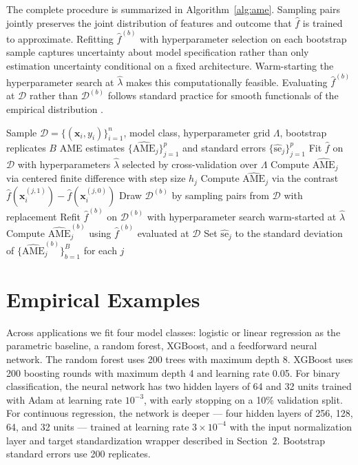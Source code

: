 \documentclass[conference]{IEEEtran}
\begin{document}
	The complete procedure is summarized in Algorithm~\ref{alg:ame}. Sampling pairs jointly preserves the joint distribution of features and outcome that $\hat{f}$ is trained to approximate. Refitting $\hat{f}^{(b)}$ with hyperparameter selection on each bootstrap sample captures uncertainty about model specification rather than only estimation uncertainty conditional on a fixed architecture. Warm-starting the hyperparameter search at $\hat{\lambda}$ makes this computationally feasible. Evaluating $\hat{f}^{(b)}$ at $\mathcal{D}$ rather than $\mathcal{D}^{(b)}$ follows standard practice for smooth functionals of the empirical distribution \cite{efrontibshirani1993}.
	
	\begin{algorithm}
		\caption{AME estimation with bootstrap inference}
		\label{alg:ame}
		\begin{algorithmic}[1]
			\Require Sample $\mathcal{D} = \{(\mathbf{x}_i, y_i)\}_{i=1}^n$, model class, hyperparameter grid $\Lambda$, bootstrap replicates $B$
			\Ensure AME estimates $\{\widehat{\mathrm{AME}}_j\}_{j=1}^p$ and standard errors $\{\widehat{\mathrm{se}}_j\}_{j=1}^p$
			\State Fit $\hat{f}$ on $\mathcal{D}$ with hyperparameters $\hat{\lambda}$ selected by cross-validation over $\Lambda$
			\State Compute $\widehat{\mathrm{AME}}_j$ via centered finite difference with step size $h_j$
			\Else
			\State Compute $\widehat{\mathrm{AME}}_j$ via the contrast $\hat{f}(\mathbf{x}_i^{(j,1)}) - \hat{f}(\mathbf{x}_i^{(j,0)})$
			\EndIf
			\EndFor
			\State Draw $\mathcal{D}^{(b)}$ by sampling pairs from $\mathcal{D}$ with replacement
			\State Refit $\hat{f}^{(b)}$ on $\mathcal{D}^{(b)}$ with hyperparameter search warm-started at $\hat{\lambda}$
			\State Compute $\widehat{\mathrm{AME}}_j^{(b)}$ using $\hat{f}^{(b)}$ evaluated at $\mathcal{D}$
			\EndFor
			\EndFor
			\State Set $\widehat{\mathrm{se}}_j$ to the standard deviation of $\{\widehat{\mathrm{AME}}_j^{(b)}\}_{b=1}^B$ for each $j$
		\end{algorithmic}
	\end{algorithm}
	
	\section{Empirical Examples}
	
	Across applications we fit four model classes: logistic or linear regression as the parametric baseline, a random forest, XGBoost, and a feedforward neural network. The random forest uses 200 trees with maximum depth 8. XGBoost uses 200 boosting rounds with maximum depth 4 and learning rate 0.05. For binary classification, the neural network has two hidden layers of 64 and 32 units trained with Adam at learning rate $10^{-3}$, with early stopping on a 10\% validation split. For continuous regression, the network is deeper --- four hidden layers of 256, 128, 64, and 32 units --- trained at learning rate $3 \times 10^{-4}$ with the input normalization layer and target standardization wrapper described in Section~2. Bootstrap standard errors use 200 replicates.
	
\end{document}
